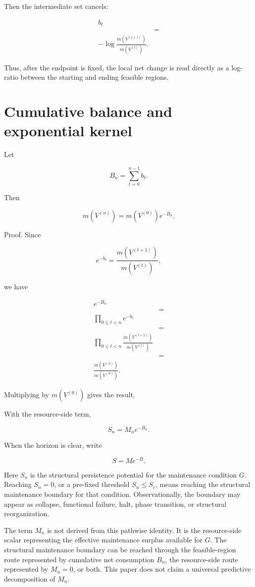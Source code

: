 \documentclass[12pt,a4paper]{article}
\begin{document}
Then the intermediate set cancels:

\[
\begin{aligned}
b_{t} \\
&= \\
-\log\frac{m(V^{(t+1)})}{m(V^{(t)})}.
\end{aligned}
\]

Thus, after the endpoint is fixed, the local net change is read directly as a log-ratio between the starting and ending feasible regions.

\section{Cumulative balance and exponential kernel}\label{cumulative-balance-and-exponential-kernel}

Let

\[
B_{n}=\sum_{t=0}^{n-1}b_{t}.
\]

Then

\[
m(V^{(n)})=m(V^{(0)})e^{-B_{n}}.
\]

Proof. Since

\[
e^{-b_{t}}=\frac{m(V^{(t+1)})}{m(V^{(t)})},
\]

we have

\[
\begin{aligned}
e^{-B_{n}} \\
&= \\
\prod_{0\le t<n}e^{-b_{t}} \\
&= \\
\prod_{0\le t<n}\frac{m(V^{(t+1)})}{m(V^{(t)})} \\
&= \\
\frac{m(V^{(n)})}{m(V^{(0)})}.
\end{aligned}
\]

Multiplying by \(m(V^{(0)})\) gives the result.

With the resource-side term,

\[
S_{n}=M_{n} e^{-B_{n}}.
\]

When the horizon is clear, write

\[
S=Me^{-B}.
\]

Here \(S_{n}\) is the structural persistence potential for the maintenance condition \(G\). Reaching \(S_{n}=0\), or a pre-fixed threshold \(S_{n}\le S_{c}\), means reaching the structural maintenance boundary for that condition. Observationally, the boundary may appear as collapse, functional failure, halt, phase transition, or structural reorganization.

The term \(M_{n}\) is not derived from this pathwise identity. It is the resource-side scalar representing the effective maintenance surplus available for \(G\). The structural maintenance boundary can be reached through the feasible-region route represented by cumulative net consumption \(B_{n}\), the resource-side route represented by \(M_{n}=0\), or both. This paper does not claim a universal predictive decomposition of \(M_{n}\).
\end{document}
